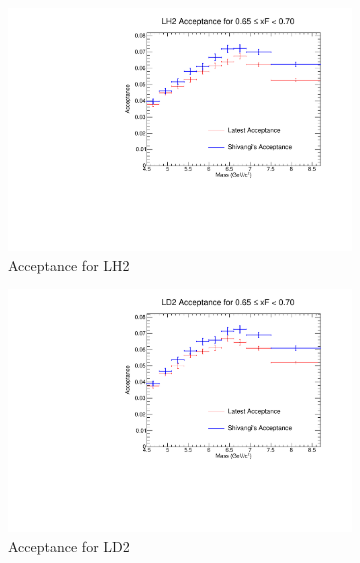 \documentclass[11pt]{article}
\begin{document}
\begin{figure}[p]
    \centering
    \begin{subfigure}[b]{0.48\textwidth}
       \includegraphics[width=\linewidth]{./acceptancePlots/LH2_acceptance_xF_bin_13.pdf}
       \caption{Acceptance for LH2}
    \end{subfigure}\hfill
    \begin{subfigure}[b]{0.48\textwidth}
       \includegraphics[width=\linewidth]{./acceptancePlots/LD2_acceptance_xF_bin_13.pdf}
       \caption{Acceptance for LD2}
    \end{subfigure}
    \begin{subfigure}[b]{0.48\textwidth}

\end{subfigure}
\end{figure}
\end{document}
